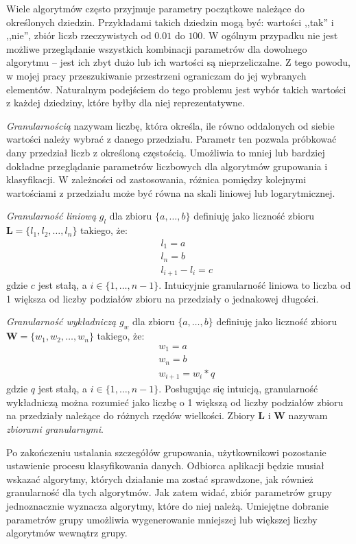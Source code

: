 \documentclass[../thesis.tex]{subfiles}
\begin{document}
Wiele algorytmów często przyjmuje parametry początkowe należące do określonych dziedzin. Przykładami takich dziedzin mogą być: wartości ,,tak'' i ,,nie'', zbiór liczb rzeczywistych od $0.01$ do $100$. W ogólnym przypadku nie jest możliwe przeglądanie wszystkich kombinacji parametrów dla dowolnego algorytmu -- jest ich zbyt dużo lub ich wartości są nieprzeliczalne. Z tego powodu, w mojej pracy przeszukiwanie przestrzeni ograniczam do jej wybranych elementów. Naturalnym podejściem do tego problemu jest wybór takich wartości z każdej dziedziny, które byłby dla niej reprezentatywne. 

\emph{Granularnością} nazywam liczbę, która określa, ile równo oddalonych od siebie wartości należy wybrać z danego przedziału. Parametr ten pozwala próbkować dany przedział liczb z określoną częstością. Umożliwia to mniej lub bardziej dokładne przeglądanie parametrów liczbowych dla algorytmów grupowania i klasyfikacji. W zależności od zastosowania, różnica pomiędzy kolejnymi wartościami z przedziału może być równa na skali liniowej lub logarytmicznej.

\textit{Granularność liniową} $g_l$ dla zbioru $\{a, \ldots, b\}$ definiuję jako liczność zbioru $\textbf{L} = \{l_1, l_2, \ldots, l_n\}$ takiego, że:
\begin{eqnarray*}
&& l_1 = a \\
&& l_n = b \\
&& l_{i+1} - l_i = c
\end{eqnarray*}
gdzie $c$ jest stałą, a $i \in \{1, \ldots, n-1\}$. Intuicyjnie granularność liniowa to liczba od 1 większa od liczby podziałów zbioru na przedziały o jednakowej długości.

\textit{Granularność wykładniczą} $g_w$ dla zbioru $\{a, \ldots, b\}$ definiuję jako liczność zbioru $\textbf{W} = \{w_1, w_2, \ldots, w_n\}$ takiego, że:
\begin{eqnarray*}
&& w_1 = a \\
&& w_n = b \\
&& w_{i+1} = w_i * q
\end{eqnarray*}
gdzie $q$ jest stałą, a $i \in \{1, \ldots, n-1\}$. Posługując się intuicją, granularność wykładniczą można rozumieć jako liczbę o 1 większą od liczby podziałów zbioru na przedziały należące do różnych rzędów wielkości. Zbiory $\textbf{L}$ i $\textbf{W}$ nazywam \textit{zbiorami granularnymi}.

Po zakończeniu ustalania szczegółów grupowania, użytkownikowi pozostanie ustawienie procesu klasyfikowania danych. Odbiorca aplikacji będzie musiał wskazać algorytmy, których działanie ma zostać sprawdzone, jak również granularność dla tych algorytmów. Jak zatem widać, zbiór parametrów grupy jednoznacznie wyznacza algorytmy, które do niej należą. Umiejętne dobranie parametrów grupy umożliwia wygenerowanie mniejszej lub większej liczby algorytmów wewnątrz grupy.
\end{document}
